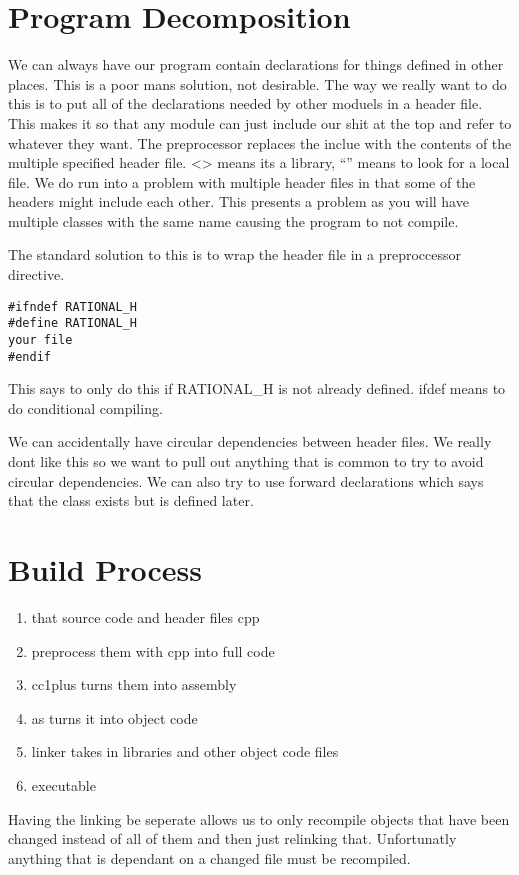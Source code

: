 \documentclass[12pt]{article}
\begin{document}
\section*{Program Decomposition}	
We can always have our program contain declarations for things defined in other places. This is a poor mans solution, not desirable. The way we really want to do this is to put all of the declarations needed by other moduels in a header file. This makes it so that any module can just include our shit at the top and refer to whatever they want. The preprocessor replaces the inclue with the contents of the multiple specified header file. <> means its a library, ``'' means to look for a local file. We do run into a problem with multiple header files in that some of the headers might include each other. This presents a problem as you will have multiple classes with the same name causing the program to not compile.

The standard solution to this is to wrap the header file in a preproccessor directive. 
\begin{verbatim}
#ifndef RATIONAL_H
#define RATIONAL_H
your file
#endif 	
\end{verbatim} 
This says to only do this if RATIONAL\_H is not already defined. ifdef means to do conditional compiling.

We can accidentally have circular dependencies between header files. We really dont like this so we want to pull out anything that is common to try to avoid circular dependencies. We can also try to use forward declarations which says that the class exists but is defined later.

\section*{Build Process}
\begin{enumerate}
	\item that source code and header files cpp
	\item  preprocess them with cpp into full code
	\item cc1plus turns them into assembly
	\item as turns it into object code
	\item linker takes in libraries and other object code files
	\item executable
\end{enumerate}

Having the linking be seperate allows us to only recompile objects that have been changed instead of all of them and then just relinking that. Unfortunatly anything that is dependant on a changed file must be recompiled. 
\end{document}
